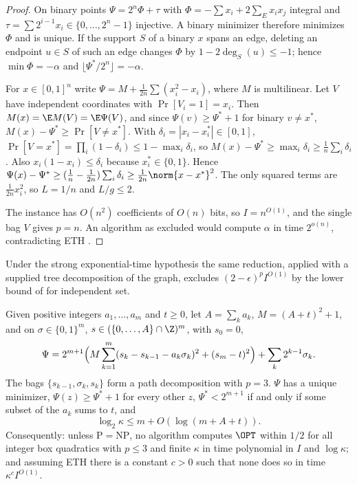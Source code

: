 \begin{proof}
On binary points $\Psi=2^n\Phi+\tau$ with $\Phi=-\sum x_i+2\sum_Ex_ix_j$
integral and $\tau=\sum2^{i-1}x_i\in\{0,\dots,2^n-1\}$ injective. A binary
minimizer therefore minimizes $\Phi$ and is unique. If the support $S$ of a
binary $x$ spans an edge, deleting an endpoint $u\in S$ of such an edge changes
$\Phi$ by $1-2\deg_S(u)\le-1$; hence $\min\Phi=-\alpha$ and
$\lfloor\Psi^*/2^n\rfloor=-\alpha$.

For $x\in[0,1]^n$ write $\Psi=M+\frac1{2n}\sum(x_i^2-x_i)$, where $M$ is
multilinear. Let $V$ have independent coordinates with $\Pr[V_i=1]=x_i$. Then
$M(x)=\E M(V)=\E\Psi(V)$, and since $\Psi(v)\ge\Psi^*+1$ for binary
$v\ne x^*$, $M(x)-\Psi^*\ge\Pr[V\ne x^*]$. With
$\delta_i=|x_i-x_i^*|\in[0,1]$,
$\Pr[V=x^*]=\prod_i(1-\delta_i)\le1-\max_i\delta_i$, so
$M(x)-\Psi^*\ge\max_i\delta_i\ge\frac1n\sum_i\delta_i$. Also
$x_i(1-x_i)\le\delta_i$ because $x_i^*\in\{0,1\}$. Hence
$\Psi(x)-\Psi^*\ge(\frac1n-\frac1{2n})\sum_i\delta_i\ge\frac1{2n}\norm{x-x^*}^2$.
The only squared terms are $\frac1{2n}x_i^2$, so $L=1/n$ and $L/g\le2$.

The instance has $O(n^2)$ coefficients of $O(n)$ bits, so $I=n^{O(1)}$, and
the single bag $V$ gives $p=n$. An algorithm as excluded would compute
$\alpha$ in time $2^{o(n)}$, contradicting ETH
\cite{ImpagliazzoPaturiZane2001}.
\end{proof}

Under the strong exponential-time hypothesis the same reduction, applied with
a supplied tree decomposition of the graph, excludes $(2-\epsilon)^pI^{O(1)}$
by the lower bound of \cite{LokshtanovMarxSaurabh2018} for independent set.

\begin{proposition}
\label{core:prop:lbkappa}
Given positive integers $a_1,\dots,a_m$ and $t\ge0$, let $A=\sum_ka_k$,
$M=(A+t)^2+1$, and on $\sigma\in\{0,1\}^m$, $s\in(\{0,\dots,A\}\cap\Z)^m$, with
$s_0=0$,
\[
\Psi=2^{m+1}\Bigl(M\sum_{k=1}^m(s_k-s_{k-1}-a_k\sigma_k)^2+(s_m-t)^2\Bigr)
+\sum_k2^{k-1}\sigma_k .
\]
The bags $\{s_{k-1},\sigma_k,s_k\}$ form a path decomposition with $p=3$.
$\Psi$ has a unique minimizer, $\Psi(z)\ge\Psi^*+1$ for every other $z$,
$\Psi^*<2^{m+1}$ if and only if some subset of the $a_k$ sums to $t$, and
\[
\log_2\kappa\le m+O(\log(m+A+t)).
\]
Consequently: unless $\mathrm{P}=\mathrm{NP}$, no algorithm computes $\OPT$
within $1/2$ for all integer box quadratics with $p\le3$ and finite $\kappa$
in time polynomial in $I$ and $\log\kappa$; and assuming ETH there is a
constant $c>0$ such that none does so in time $\kappa^cI^{O(1)}$.
\end{proposition}

